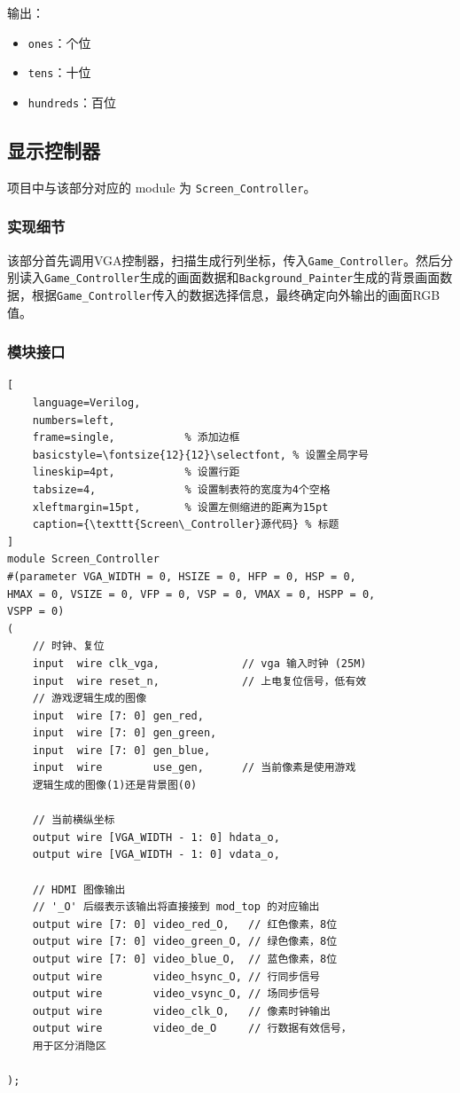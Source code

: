 输出：
\begin{itemize}
    \item \texttt{ones}：个位
    \item \texttt{tens}：十位
    \item \texttt{hundreds}：百位
\end{itemize}


\subsection{显示控制器}
项目中与该部分对应的 module 为 \texttt{Screen\_Controller}。
\subsubsection{实现细节}
该部分首先调用VGA控制器，扫描生成行列坐标，传入\texttt{Game\_Controller}。然后分别读入\texttt{Game\_Controller}生成的画面数据和\texttt{Background\_Painter}生成的背景画面数据，根据\texttt{Game\_Controller}传入的数据选择信息，最终确定向外输出的画面RGB值。

\subsubsection{模块接口}
\begin{lstlisting}[
    language=Verilog,
    numbers=left,
    frame=single,           % 添加边框
    basicstyle=\fontsize{12}{12}\selectfont, % 设置全局字号
    lineskip=4pt,           % 设置行距
    tabsize=4,              % 设置制表符的宽度为4个空格
    xleftmargin=15pt,       % 设置左侧缩进的距离为15pt
    caption={\texttt{Screen\_Controller}源代码} % 标题
] 
module Screen_Controller
#(parameter VGA_WIDTH = 0, HSIZE = 0, HFP = 0, HSP = 0, 
HMAX = 0, VSIZE = 0, VFP = 0, VSP = 0, VMAX = 0, HSPP = 0, 
VSPP = 0)
(
    // 时钟、复位
    input  wire clk_vga,             // vga 输入时钟 (25M)
    input  wire reset_n,             // 上电复位信号，低有效
    // 游戏逻辑生成的图像
    input  wire [7: 0] gen_red,
    input  wire [7: 0] gen_green,
    input  wire [7: 0] gen_blue,
    input  wire        use_gen,      // 当前像素是使用游戏
    逻辑生成的图像(1)还是背景图(0)

    // 当前横纵坐标
    output wire [VGA_WIDTH - 1: 0] hdata_o,
    output wire [VGA_WIDTH - 1: 0] vdata_o,

    // HDMI 图像输出
    // '_O' 后缀表示该输出将直接接到 mod_top 的对应输出
    output wire [7: 0] video_red_O,   // 红色像素，8位
    output wire [7: 0] video_green_O, // 绿色像素，8位
    output wire [7: 0] video_blue_O,  // 蓝色像素，8位
    output wire        video_hsync_O, // 行同步信号
    output wire        video_vsync_O, // 场同步信号
    output wire        video_clk_O,   // 像素时钟输出
    output wire        video_de_O     // 行数据有效信号，
    用于区分消隐区

);
\end{lstlisting}

